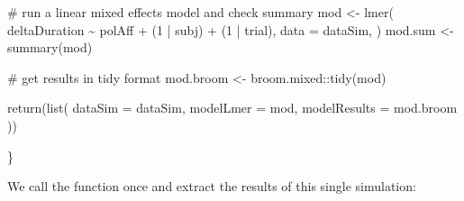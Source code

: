 \documentclass[
  letterpaper,
  DIV=11,
  numbers=noendperiod]{scrartcl}
\newenvironment{Shaded}{\begin{snugshade}}{\end{snugshade}}
\newcommand{\AttributeTok}[1]{\textcolor[rgb]{0.40,0.45,0.13}{#1}}
\newcommand{\CommentTok}[1]{\textcolor[rgb]{0.37,0.37,0.37}{#1}}
\newcommand{\DecValTok}[1]{\textcolor[rgb]{0.68,0.00,0.00}{#1}}
\newcommand{\FunctionTok}[1]{\textcolor[rgb]{0.28,0.35,0.67}{#1}}
\newcommand{\NormalTok}[1]{\textcolor[rgb]{0.00,0.23,0.31}{#1}}
\newcommand{\OtherTok}[1]{\textcolor[rgb]{0.00,0.23,0.31}{#1}}
\newcommand{\SpecialCharTok}[1]{\textcolor[rgb]{0.37,0.37,0.37}{#1}}
\begin{document}
\begin{Shaded}
\begin{Highlighting}[]
  \CommentTok{\# run a linear mixed effects model and check summary}
\NormalTok{  mod }\OtherTok{\textless{}{-}} \FunctionTok{lmer}\NormalTok{(}
\NormalTok{    deltaDuration }\SpecialCharTok{\textasciitilde{}}\NormalTok{ polAff }\SpecialCharTok{+}\NormalTok{ (}\DecValTok{1} \SpecialCharTok{|}\NormalTok{ subj) }\SpecialCharTok{+}\NormalTok{ (}\DecValTok{1} \SpecialCharTok{|}\NormalTok{ trial),}
    \AttributeTok{data =}\NormalTok{ dataSim,}
\NormalTok{  )}
\NormalTok{  mod.sum }\OtherTok{\textless{}{-}} \FunctionTok{summary}\NormalTok{(mod)}
  
  \CommentTok{\# get results in tidy format}
\NormalTok{  mod.broom }\OtherTok{\textless{}{-}}\NormalTok{ broom.mixed}\SpecialCharTok{::}\FunctionTok{tidy}\NormalTok{(mod)}
  
  \FunctionTok{return}\NormalTok{(}\FunctionTok{list}\NormalTok{(}
    \AttributeTok{dataSim =}\NormalTok{ dataSim,}
    \AttributeTok{modelLmer =}\NormalTok{ mod,}
    \AttributeTok{modelResults =}\NormalTok{ mod.broom}
\NormalTok{  ))}
  
\NormalTok{\}}
\end{Highlighting}
\end{Shaded}

We call the function once and extract the results of this single
simulation:
\end{document}
